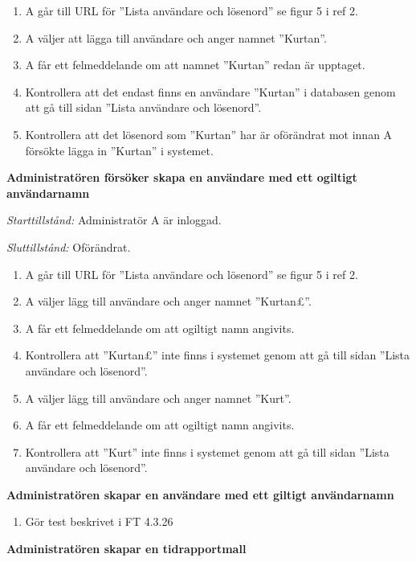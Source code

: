 \documentclass[a4paper]{article}
\begin{document}
\begin{FT}
\begin{enumerate}
\item A går till URL för ''Lista användare och lösenord'' se figur 5 i ref 2.
\item  A väljer att lägga till användare och anger namnet ''Kurtan''.
\item A får ett felmeddelande om att namnet ''Kurtan'' redan är upptaget.
\item Kontrollera att det endast finns en användare ''Kurtan'' i databasen genom att gå till sidan ''Lista användare och lösenord''.
\item Kontrollera att det lösenord som ''Kurtan'' har är oförändrat mot innan A försökte lägga in ''Kurtan'' i systemet.
\end{enumerate}

\item %
\textbf{Administratören försöker skapa en användare med ett ogiltigt användarnamn} 

\emph{Starttillstånd:} Administratör A är inloggad.

\emph{Sluttillstånd:} Oförändrat.

\begin{enumerate}
\item A går till URL för ''Lista användare och lösenord'' se figur 5 i ref 2.
\item A väljer lägg till användare och anger namnet ''Kurtan£''.
\item A får ett felmeddelande om att ogiltigt namn angivits.
\item Kontrollera att ''Kurtan£'' inte finns i systemet genom att gå till sidan ''Lista användare och lösenord''.
\item A väljer lägg till användare och anger namnet ''Kurt''.
\item A får ett felmeddelande om att ogiltigt namn angivits.
\item Kontrollera att ''Kurt'' inte finns i systemet genom att gå till sidan ''Lista användare och lösenord''.
\end{enumerate}

\item %
\textbf{Administratören skapar en användare med ett giltigt användarnamn}
\begin{enumerate}
\item Gör test beskrivet i FT 4.3.26
\end{enumerate}

\item %
\textbf{Administratören skapar en tidrapportmall}


\end{FT}
\end{document}
